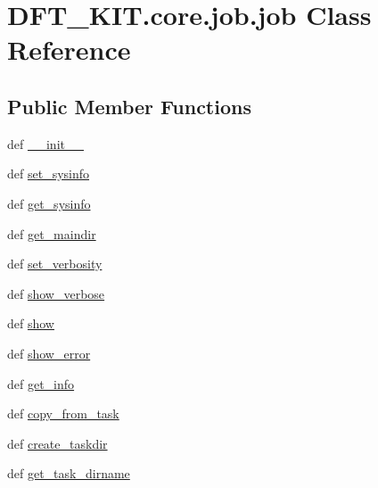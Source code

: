 \hypertarget{class_d_f_t___k_i_t_1_1core_1_1job_1_1job}{\section{D\+F\+T\+\_\+\+K\+I\+T.\+core.\+job.\+job Class Reference}
\label{class_d_f_t___k_i_t_1_1core_1_1job_1_1job}
}
\subsection*{Public Member Functions}
\begin{DoxyCompactItemize}
\item 
def \hyperlink{class_d_f_t___k_i_t_1_1core_1_1job_1_1job_a98042c98ccedc93756b3c7e7696a701e}{\+\_\+\+\_\+init\+\_\+\+\_\+}
\item 
def \hyperlink{class_d_f_t___k_i_t_1_1core_1_1job_1_1job_a24e78596f2fd5f7ff326c548a5570e8e}{set\+\_\+sysinfo}
\item 
def \hyperlink{class_d_f_t___k_i_t_1_1core_1_1job_1_1job_aff31da650d3d93fee45f1422387cf720}{get\+\_\+sysinfo}
\item 
def \hyperlink{class_d_f_t___k_i_t_1_1core_1_1job_1_1job_a2eaf8ac59a5f04cfd0108ae3c9e061f1}{get\+\_\+maindir}
\item 
def \hyperlink{class_d_f_t___k_i_t_1_1core_1_1job_1_1job_a6e1d361a90d70216572c62a3d75c62b9}{set\+\_\+verbosity}
\item 
def \hyperlink{class_d_f_t___k_i_t_1_1core_1_1job_1_1job_ac4e8212ce995ff57582d1c2855416d13}{show\+\_\+verbose}
\item 
def \hyperlink{class_d_f_t___k_i_t_1_1core_1_1job_1_1job_aa31460c9e70d5f1725cdcb76cfff995d}{show}
\item 
def \hyperlink{class_d_f_t___k_i_t_1_1core_1_1job_1_1job_a264c7da0ce37e6b0a931fa6ec1801d97}{show\+\_\+error}
\item 
def \hyperlink{class_d_f_t___k_i_t_1_1core_1_1job_1_1job_a851b6e27145aa36e552f15accf43a878}{get\+\_\+info}
\item 
def \hyperlink{class_d_f_t___k_i_t_1_1core_1_1job_1_1job_a2703bd26744462b815573eca0b4599d3}{copy\+\_\+from\+\_\+task}
\item 
def \hyperlink{class_d_f_t___k_i_t_1_1core_1_1job_1_1job_a04730fc7c00e6456b6a001bf50cead0b}{create\+\_\+taskdir}
\item 
def \hyperlink{class_d_f_t___k_i_t_1_1core_1_1job_1_1job_a3cc0db5d196995d0b6018712e204f9d0}{get\+\_\+task\+\_\+dirname}
\item 

\end{DoxyCompactItemize}
